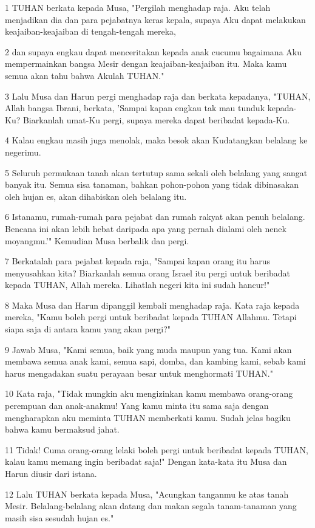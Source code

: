\par 1 TUHAN berkata kepada Musa, "Pergilah menghadap raja. Aku telah menjadikan dia dan para pejabatnya keras kepala, supaya Aku dapat melakukan keajaiban-keajaiban di tengah-tengah mereka,
\par 2 dan supaya engkau dapat menceritakan kepada anak cucumu bagaimana Aku mempermainkan bangsa Mesir dengan keajaiban-keajaiban itu. Maka kamu semua akan tahu bahwa Akulah TUHAN."
\par 3 Lalu Musa dan Harun pergi menghadap raja dan berkata kepadanya, "TUHAN, Allah bangsa Ibrani, berkata, 'Sampai kapan engkau tak mau tunduk kepada-Ku? Biarkanlah umat-Ku pergi, supaya mereka dapat beribadat kepada-Ku.
\par 4 Kalau engkau masih juga menolak, maka besok akan Kudatangkan belalang ke negerimu.
\par 5 Seluruh permukaan tanah akan tertutup sama sekali oleh belalang yang sangat banyak itu. Semua sisa tanaman, bahkan pohon-pohon yang tidak dibinasakan oleh hujan es, akan dihabiskan oleh belalang itu.
\par 6 Istanamu, rumah-rumah para pejabat dan rumah rakyat akan penuh belalang. Bencana ini akan lebih hebat daripada apa yang pernah dialami oleh nenek moyangmu.'" Kemudian Musa berbalik dan pergi.
\par 7 Berkatalah para pejabat kepada raja, "Sampai kapan orang itu harus menyusahkan kita? Biarkanlah semua orang Israel itu pergi untuk beribadat kepada TUHAN, Allah mereka. Lihatlah negeri kita ini sudah hancur!"
\par 8 Maka Musa dan Harun dipanggil kembali menghadap raja. Kata raja kepada mereka, "Kamu boleh pergi untuk beribadat kepada TUHAN Allahmu. Tetapi siapa saja di antara kamu yang akan pergi?"
\par 9 Jawab Musa, "Kami semua, baik yang muda maupun yang tua. Kami akan membawa semua anak kami, semua sapi, domba, dan kambing kami, sebab kami harus mengadakan suatu perayaan besar untuk menghormati TUHAN."
\par 10 Kata raja, "Tidak mungkin aku mengizinkan kamu membawa orang-orang perempuan dan anak-anakmu! Yang kamu minta itu sama saja dengan mengharapkan aku meminta TUHAN memberkati kamu. Sudah jelas bagiku bahwa kamu bermaksud jahat.
\par 11 Tidak! Cuma orang-orang lelaki boleh pergi untuk beribadat kepada TUHAN, kalau kamu memang ingin beribadat saja!" Dengan kata-kata itu Musa dan Harun diusir dari istana.
\par 12 Lalu TUHAN berkata kepada Musa, "Acungkan tanganmu ke atas tanah Mesir. Belalang-belalang akan datang dan makan segala tanam-tanaman yang masih sisa sesudah hujan es."
